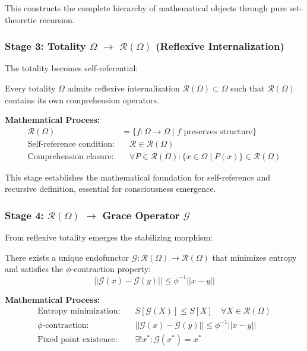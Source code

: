 This constructs the complete hierarchy of mathematical objects through pure set-theoretic recursion.

\subsubsection{Stage 3: Totality $\Omega$ $\rightarrow$ $\mathcal{R}(\Omega)$ (Reflexive Internalization)}

The totality becomes self-referential:

\begin{axiom}
Every totality $\Omega$ admits reflexive internalization $\mathcal{R}(\Omega) \subset \Omega$ such that $\mathcal{R}(\Omega)$ contains its own comprehension operators.
\end{axiom}

\textbf{Mathematical Process:}
\begin{align}
\mathcal{R}(\Omega) &= \{f: \Omega \rightarrow \Omega \mid f \text{ preserves structure}\}\\
\text{Self-reference condition:} &\quad \mathcal{R} \in \mathcal{R}(\Omega)\\
\text{Comprehension closure:} &\quad \forall P \in \mathcal{R}(\Omega): \{x \in \Omega \mid P(x)\} \in \mathcal{R}(\Omega)
\end{align}

This stage establishes the mathematical foundation for self-reference and recursive definition, essential for consciousness emergence.

\subsubsection{Stage 4: $\mathcal{R}(\Omega)$ $\rightarrow$ Grace Operator $\mathcal{G}$}

From reflexive totality emerges the stabilizing morphism:

\begin{axiom}
There exists a unique endofunctor $\mathcal{G}: \mathcal{R}(\Omega) \rightarrow \mathcal{R}(\Omega)$ that minimizes entropy and satisfies the $\phi$-contraction property:
\begin{equation}
||\mathcal{G}(x) - \mathcal{G}(y)|| \leq \phi^{-1} ||x - y||
\end{equation}
\end{axiom}

\textbf{Mathematical Process:}
\begin{align}
\text{Entropy minimization:} &\quad S[\mathcal{G}(X)] \leq S[X] \quad \forall X \in \mathcal{R}(\Omega)\\
\text{$\phi$-contraction:} &\quad ||\mathcal{G}(x) - \mathcal{G}(y)|| \leq \phi^{-1} ||x - y||\\
\text{Fixed point existence:} &\quad \exists! x^* : \mathcal{G}(x^*) = x^*
\end{align}

